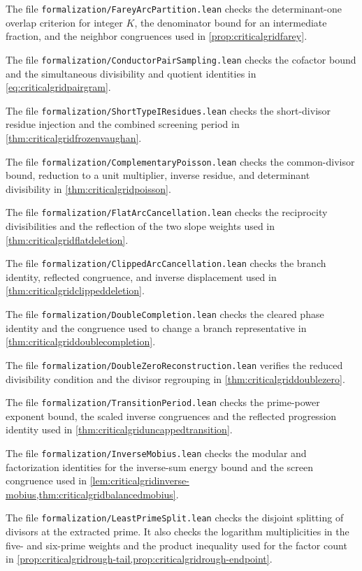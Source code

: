 \documentclass[11pt,a4paper]{article}
\numberwithin{equation}{section}
\begin{document}
The file \texttt{formalization/FareyArcPartition.lean}
checks the determinant-one overlap criterion for integer $K$,
the denominator bound for an intermediate fraction, and the
neighbor congruences used in \cref{prop:criticalgridfarey}.

The file \texttt{formalization/ConductorPairSampling.lean}
checks the cofactor bound and the simultaneous divisibility
and quotient identities in \cref{eq:criticalgridpairgram}.

The file \texttt{formalization/ShortTypeIResidues.lean}
checks the short-divisor residue injection and the combined
screening period in \cref{thm:criticalgridfrozenvaughan}.

The file \texttt{formalization/ComplementaryPoisson.lean}
checks the common-divisor bound, reduction to a unit
multiplier, inverse residue, and determinant divisibility
in \cref{thm:criticalgridpoisson}.

The file \texttt{formalization/FlatArcCancellation.lean}
checks the reciprocity divisibilities and the reflection
of the two slope weights used in \cref{thm:criticalgridflatdeletion}.

The file \texttt{formalization/ClippedArcCancellation.lean}
checks the branch identity, reflected congruence, and inverse
displacement used in \cref{thm:criticalgridclippeddeletion}.

The file \texttt{formalization/DoubleCompletion.lean}
checks the cleared phase identity and the congruence
used to change a branch representative in
\cref{thm:criticalgriddoublecompletion}.

The file \texttt{formalization/DoubleZeroReconstruction.lean}
verifies the reduced divisibility condition and the
divisor regrouping in \cref{thm:criticalgriddoublezero}.

The file \texttt{formalization/TransitionPeriod.lean}
checks the prime-power exponent bound, the scaled inverse
congruences and the reflected progression identity used
in \cref{thm:criticalgriduncappedtransition}.

The file \texttt{formalization/InverseMobius.lean}
checks the modular and factorization identities for
the inverse-sum energy bound and the screen congruence
used in \cref{lem:criticalgridinverse-mobius,thm:criticalgridbalancedmobius}.

The file \texttt{formalization/LeastPrimeSplit.lean}
checks the disjoint splitting of divisors at the
extracted prime. It also checks the logarithm multiplicities
in the five- and six-prime weights and the product inequality
used for the factor count in
\cref{prop:criticalgridrough-tail,prop:criticalgridrough-endpoint}.
\end{document}
